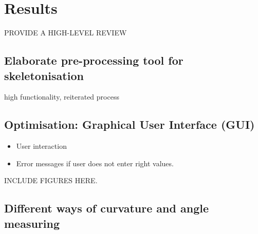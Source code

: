 
\chapter{Results} %

\label{results} %

%


PROVIDE A HIGH-LEVEL REVIEW


\section{Elaborate pre-processing tool for skeletonisation}
high functionality, reiterated process


\section{Optimisation: Graphical User Interface (GUI)}

\begin{itemize}
	\item User interaction
	\item Error messages if user does not enter right values.
\end{itemize}

INCLUDE FIGURES HERE.


\section{Different ways of curvature and angle measuring}

